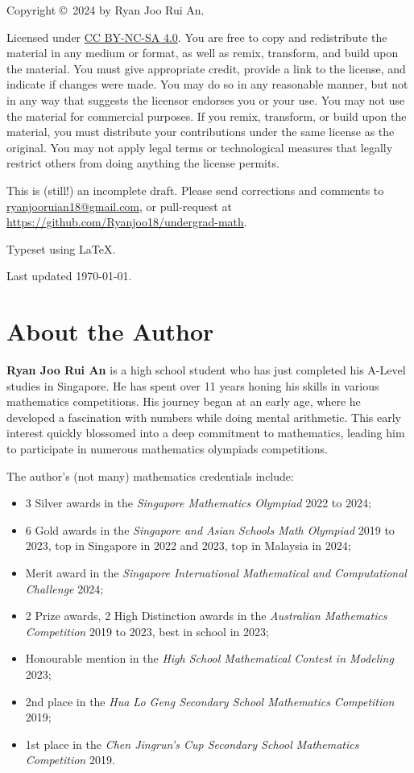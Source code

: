 \vfill

Copyright \copyright \ 2024 by Ryan Joo Rui An.

Licensed under \href{https://creativecommons.org/licenses/by-nc-sa/4.0/}{CC BY-NC-SA 4.0}. You are free to copy and redistribute the material in any medium or format, as well as remix, transform, and build upon the material. You must give appropriate credit, provide a link to the license, and indicate if changes were made. You may do so in any reasonable manner, but not in any way that suggests the licensor endorses you or your use. You may not use the material for commercial purposes. If you remix, transform, or build upon the material, you must distribute your contributions under the same license as the original. You may not apply legal terms or technological measures that legally restrict others from doing anything the license permits.

This is (still!) an incomplete draft. Please send corrections and comments to \url{ryanjooruian18@gmail.com}, or pull-request at \url{https://github.com/Ryanjoo18/undergrad-math}.

Typeset using \LaTeX.

Last updated \today.
\pagebreak

\frontmatter
\section*{About the Author}
\textbf{Ryan Joo Rui An} is a high school student who has just completed his A-Level studies in Singapore. He has spent over 11 years honing his skills in various mathematics competitions. His journey began at an early age, where he developed a fascination with numbers while doing mental arithmetic. This early interest quickly blossomed into a deep commitment to mathematics, leading him to participate in numerous mathematics olympiads competitions.

The author's (not many) mathematics credentials include:
\begin{itemize}
\item 3 Silver awards in the \emph{Singapore Mathematics Olympiad} 2022 to 2024;
\item 6 Gold awards in the \emph{Singapore and Asian Schools Math Olympiad} 2019 to 2023, top in Singapore in 2022 and 2023, top in Malaysia in 2024;
\item Merit award in the \emph{Singapore International Mathematical and Computational Challenge} 2024;
\item 2 Prize awards, 2 High Distinction awards in the \emph{Australian Mathematics Competition} 2019 to 2023, best in school in 2023;
\item Honourable mention in the \emph{High School Mathematical Contest in Modeling} 2023;
\item 2nd place in the \emph{Hua Lo Geng Secondary School Mathematics Competition} 2019;
\item 1st place in the \emph{Chen Jingrun's Cup Secondary School Mathematics Competition} 2019.
\end{itemize}

